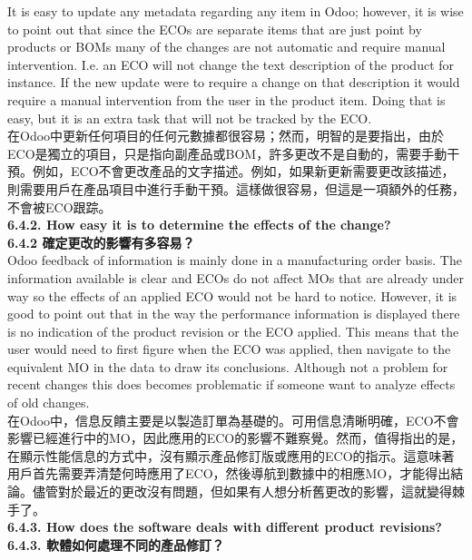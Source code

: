 \documentclass[12pt,a4paper]{report}  %
\begin{document}
It is easy to update any metadata regarding any item in Odoo; however, it is wise to point 
out that since the ECOs are separate items that are just point by products or BOMs many of the changes are not automatic and require manual intervention. I.e. an ECO will not change the text description of the product for instance. If the new update were to require a change on that description it would require a manual intervention from the user in the product item. 
Doing that is easy, but it is an extra task that will not be tracked by the ECO.\\
在Odoo中更新任何項目的任何元數據都很容易；然而，明智的是要指出，由於ECO是獨立的項目，只是指向副產品或BOM，許多更改不是自動的，需要手動干預。例如，ECO不會更改產品的文字描述。例如，如果新更新需要更改該描述，則需要用戶在產品項目中進行手動干預。這樣做很容易，但這是一項額外的任務，不會被ECO跟踪。\\

\Large\textbf{6.4.2. How easy it is to determine the effects of the change?}\\
\Large\textbf{6.4.2 確定更改的影響有多容易？}\\
    
Odoo feedback of information is mainly done in a manufacturing order basis. The 
information available is clear and ECOs do not affect MOs that are already under way so the 
effects of an applied ECO would not be hard to notice. However, it is good to point out that 
in the way the performance information is displayed there is no indication of the product 
revision or the ECO applied. This means that the user would need to first figure when the 
ECO was applied, then navigate to the equivalent MO in the data to draw its conclusions. 
Although not a problem for recent changes this does becomes problematic if someone want 
to analyze effects of old changes.\\
在Odoo中，信息反饋主要是以製造訂單為基礎的。可用信息清晰明確，ECO不會影響已經進行中的MO，因此應用的ECO的影響不難察覺。然而，值得指出的是，在顯示性能信息的方式中，沒有顯示產品修訂版或應用的ECO的指示。這意味著用戶首先需要弄清楚何時應用了ECO，然後導航到數據中的相應MO，才能得出結論。儘管對於最近的更改沒有問題，但如果有人想分析舊更改的影響，這就變得棘手了。\\

\Large\textbf{6.4.3. How does the software deals with different product revisions?}\\
\Large\textbf{6.4.3. 軟體如何處理不同的產品修訂？}\\
\end{document}
